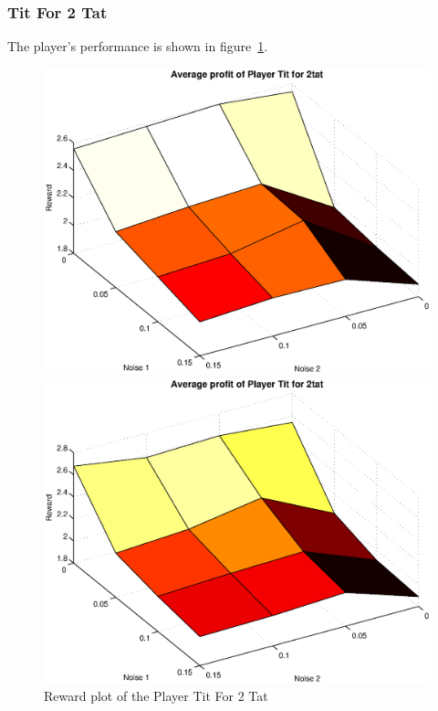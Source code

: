\subsubsection{Tit For 2 Tat}
The player's performance is shown in figure~\ref{pic player tf2t}.\\
\begin{figure}[h]
	\caption{Reward plot of the Player Tit For 2 Tat}
	\label{pic player tf2t}
\begin{minipage}[hbt]{0.65\textwidth}
	\centering
	\includegraphics[width=\textwidth]{pics/simulation1/Reward_vs_Noise_of_Player_Tit_for_2tat}
\end{minipage}
\hfill
\begin{minipage}[hbt]{0.3\textwidth}
	\centering
	\includegraphics[width=\textwidth]{pics/simulation2/Reward_vs_Noise_of_Player_Tit_for_2tat}
\end{minipage}

\end{figure}


